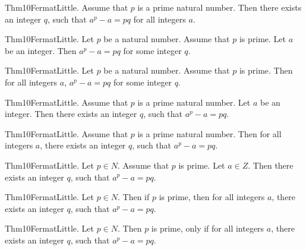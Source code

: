 \documentclass{article}
\begin{document}
Thm10FermatLittle. Assume that $p$ is a prime natural number. Then there exists an integer $q$, such that $a ^ {p}- a = p q$ for all integers $a$.

Thm10FermatLittle. Let $p$ be a natural number. Assume that $p$ is prime. Let $a$ be an integer. Then $a ^ {p}- a = p q$ for some integer $q$.

Thm10FermatLittle. Let $p$ be a natural number. Assume that $p$ is prime. Then for all integers $a$, $a ^ {p}- a = p q$ for some integer $q$.

Thm10FermatLittle. Assume that $p$ is a prime natural number. Let $a$ be an integer. Then there exists an integer $q$, such that $a ^ {p}- a = p q$.

Thm10FermatLittle. Assume that $p$ is a prime natural number. Then for all integers $a$, there exists an integer $q$, such that $a ^ {p}- a = p q$.

Thm10FermatLittle. Let $p \in N$. Assume that $p$ is prime. Let $a \in Z$. Then there exists an integer $q$, such that $a ^ {p}- a = p q$.

Thm10FermatLittle. Let $p \in N$. Then if $p$ is prime, then for all integers $a$, there exists an integer $q$, such that $a ^ {p}- a = p q$.

Thm10FermatLittle. Let $p \in N$. Then $p$ is prime, only if for all integers $a$, there exists an integer $q$, such that $a ^ {p}- a = p q$.
\end{document}
